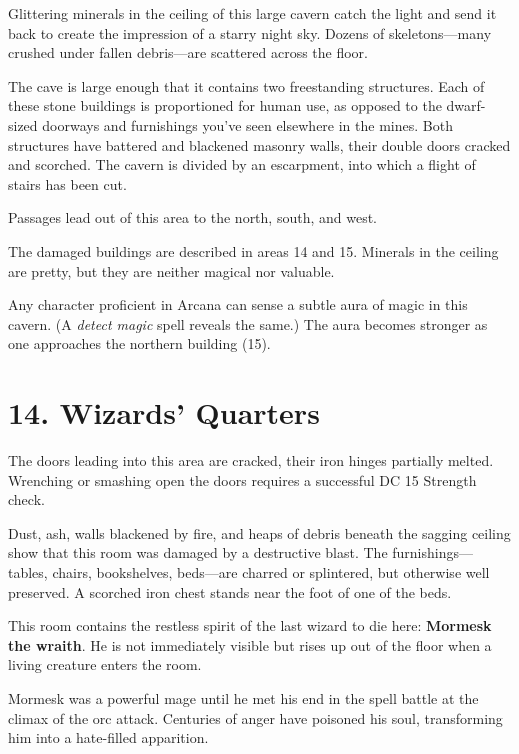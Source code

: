 \documentclass[10pt,a4paper,twoside,bg=print,twocolumn,openany,nodeprecatedcode]{dndbook}
\begin{document}
\begin{DndReadAloud}{}
Glittering minerals in the ceiling of this large cavern catch the light and send it back to create the impression of a starry night sky. Dozens of skeletons—many crushed under fallen debris—are scattered across the floor.

The cave is large enough that it contains two freestanding structures. Each of these stone buildings is proportioned for human use, as opposed to the dwarf-sized doorways and furnishings you've seen elsewhere in the mines. Both structures have battered and blackened masonry walls, their double doors cracked and scorched. The cavern is divided by an escarpment, into which a flight of stairs has been cut.

Passages lead out of this area to the north, south, and west.

\end{DndReadAloud}

The damaged buildings are described in areas 14 and 15. Minerals in the ceiling are pretty, but they are neither magical nor valuable.

Any character proficient in Arcana can sense a subtle aura of magic in this cavern. (A \textit{detect magic} spell reveals the same.) The aura becomes stronger as one approaches the northern building (15).

\section{14. Wizards' Quarters}
The doors leading into this area are cracked, their iron hinges partially melted. Wrenching or smashing open the doors requires a successful DC 15 Strength check.

\begin{DndReadAloud}{}
Dust, ash, walls blackened by fire, and heaps of debris beneath the sagging ceiling show that this room was damaged by a destructive blast. The furnishings—tables, chairs, bookshelves, beds—are charred or splintered, but otherwise well preserved. A scorched iron chest stands near the foot of one of the beds.

\end{DndReadAloud}

This room contains the restless spirit of the last wizard to die here: \textbf{Mormesk the wraith}. He is not immediately visible but rises up out of the floor when a living creature enters the room.

Mormesk was a powerful mage until he met his end in the spell battle at the climax of the orc attack. Centuries of anger have poisoned his soul, transforming him into a hate-filled apparition.
\end{document}
